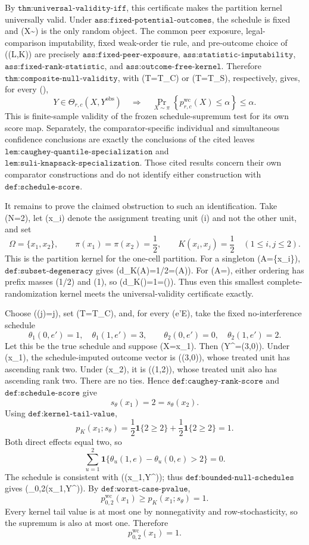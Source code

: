 By \(\texttt{thm:universal-validity-iff}\), this certificate makes the partition kernel universally valid.  Under \(\texttt{ass:fixed-potential-outcomes}\), the schedule is fixed and (X\sim\pi) is the only random object.  The common peer exposure, legal-comparison imputability, fixed weak-order tie rule, and pre-outcome choice of ((L,K)) are precisely \(\texttt{ass:fixed-peer-exposure}\), \(\texttt{ass:statistic-imputability}\), \(\texttt{ass:fixed-rank-statistic}\), and \(\texttt{ass:outcome-free-kernel}\).  Therefore \(\texttt{thm:composite-null-validity}\), with (T=T_{\mathrm C}) or (T=T_{\mathrm S}), respectively, gives, for every (\alpha\in[0,1]),
\[
 Y\in\Theta_{r,c}(X,Y^{\mathrm{obs}})
 \quad\Longrightarrow\quad
 \Pr_{X\sim\pi}\!\left\{p^{\mathrm{wc}}_{r,c}(X)\leq\alpha\right\}
 \leq\alpha.
\]
This is finite-sample validity of the frozen schedule-supremum test for its own score map.  Separately, the comparator-specific individual and simultaneous confidence conclusions are exactly the conclusions of the cited leaves \(\texttt{lem:caughey-quantile-specialization}\) and \(\texttt{lem:suli-knapsack-specialization}\).  Those cited results concern their own comparator constructions and do not identify either construction with \(\texttt{def:schedule-score}\).

It remains to prove the claimed obstruction to such an identification.  Take (N=2), let (x_i) denote the assignment treating unit (i) and not the other unit, and set
\[
 \Omega=\{x_1,x_2\},\qquad
 \pi(x_1)=\pi(x_2)=\frac12,
 \qquad K(x_i,x_j)=\frac12\quad(1\leq i,j\leq2).
\]
This is the partition kernel for the one-cell partition.  For a singleton (A=\{x_i\}), \(\texttt{def:subset-degeneracy}\) gives (d_K(A)=1/2=\pi(A)).  For (A=\Omega), either ordering has prefix masses (1/2) and (1), so (d_K(\Omega)=1=\pi(\Omega)).  Thus even this smallest complete-randomization kernel meets the universal-validity certificate exactly.

Choose (\phi(j)=j), set (T=T_{\mathrm C}), and, for every (e'\in\mathcal E), take the fixed no-interference schedule
\[
 \theta_1(0,e')=1,\quad \theta_1(1,e')=3,
 \qquad
 \theta_2(0,e')=0,\quad \theta_2(1,e')=2.
\]
Let this be the true schedule and suppose (X=x_1).  Then (Y^{}=(3,0)).  Under (x_1), the schedule-imputed outcome vector is ((3,0)), whose treated unit has ascending rank two.  Under (x_2), it is ((1,2)), whose treated unit also has ascending rank two.  There are no ties.  Hence \(\texttt{def:caughey-rank-score}\) and \(\texttt{def:schedule-score}\) give
\[
 s_\theta(x_1)=2=s_\theta(x_2).
\]
Using \(\texttt{def:kernel-tail-value}\),
\[
 p_K(x_1;s_\theta)
 =\frac12\mathbf 1\{2\geq2\}
  +\frac12\mathbf 1\{2\geq2\}=1.
\]
Both direct effects equal two, so
\[
 \sum_{u=1}^{2}\mathbf 1\{\theta_u(1,e)-\theta_u(0,e)>2\}=0.
\]
The schedule is consistent with ((x_1,Y^{})); thus \(\texttt{def:bounded-null-schedules}\) gives (\theta\in\Theta_{0,2}(x_1,Y^{})).  By \(\texttt{def:worst-case-pvalue}\),
\[
 p^{\mathrm{wc}}_{0,2}(x_1)\geq p_K(x_1;s_\theta)=1.
\]
Every kernel tail value is at most one by nonnegativity and row-stochasticity, so the supremum is also at most one.  Therefore
\[
 p^{\mathrm{wc}}_{0,2}(x_1)=1.
\]

